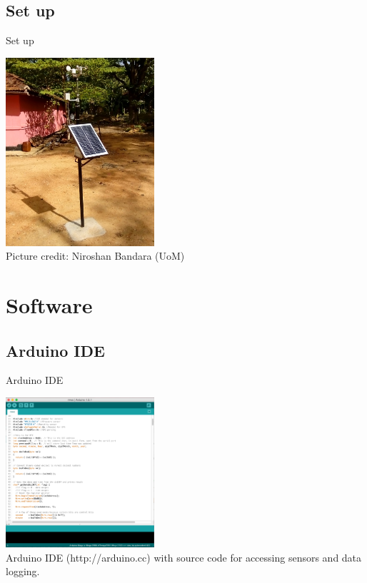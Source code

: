 \documentclass[xcolor=dvipsnames,beamer]{beamer} %
\begin{document}
\subsection{Set up}
\begin{frame}[fragile]{Set up}

\begin{center}
 \includegraphics[width=5.5cm]{IMG_20140902_151739}\\
\vspace{5mm}
Picture credit: Niroshan Bandara (UoM)
\end{center}

\end{frame}

\section{Software}
\subsection{Arduino IDE}
\begin{frame}[fragile]{Arduino IDE}

\begin{center}
 \includegraphics[width=5.5cm]{ArduinoIDE}\\
\vspace{5mm}
Arduino IDE (http://arduino.cc) with source code for accessing sensors and data logging.
\end{center}

\end{frame}
\end{document}
